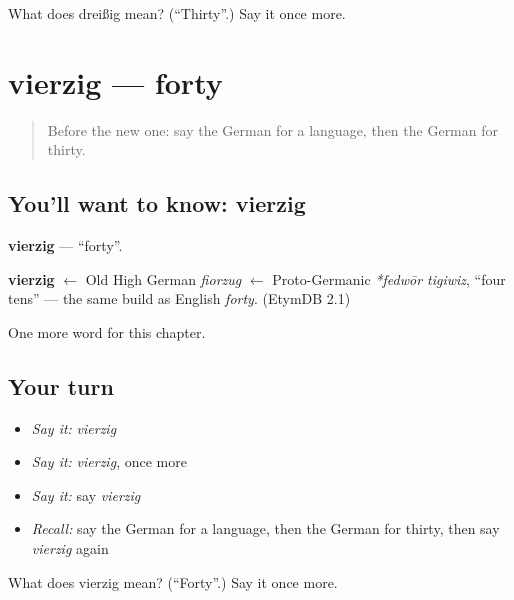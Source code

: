 \begin{tcolorbox}[breakable,colback=teal!4,colframe=teal!35!black,title={Before you move on}]
What does dreißig mean? (\textquotedblleft{}Thirty\textquotedblright{}.) Say it once more.
\end{tcolorbox}
\section[vierzig]{vierzig — forty}

\label{lesson:GE-C101-vierzig}



\begin{quote}
Before the new one: say the German for a language, then the German for thirty.
\end{quote}

\subsection*{You'll want to know: vierzig}
\textbf{vierzig} — \textquotedblleft{}forty\textquotedblright{}.

\begin{cousinweb}
\textbf{vierzig} $\leftarrow$ Old High German \emph{fiorzug} $\leftarrow$ Proto-Germanic \emph{*fedwōr tigiwiz}, \textquotedblleft{}four tens\textquotedblright{} — the same build as English \emph{forty}. (EtymDB 2.1)
\end{cousinweb}

\begin{grammarlens}[title={What you've built}]
One more word for this chapter.
\end{grammarlens}

\subsection*{Your turn}
\begin{itemize}
\raggedright
  \item \emph{Say it:} \emph{vierzig}
  \item \emph{Say it:} \emph{vierzig}, once more
  \item \emph{Say it:} say \emph{vierzig}
  \item \emph{Recall:} say the German for a language, then the German for thirty, then say \emph{vierzig} again
\end{itemize}

\begin{tcolorbox}[breakable,colback=teal!4,colframe=teal!35!black,title={Before you move on}]
What does vierzig mean? (\textquotedblleft{}Forty\textquotedblright{}.) Say it once more.
\end{tcolorbox}
